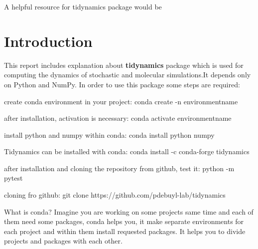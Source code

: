 \documentclass[12pt, a4paper, twoside]{report}
\begin{document}
%
%
A helpful resource for tidynamics package would be \cite{ tidynamics_2018}

%






\newpage
\section{Introduction}

This report includes explanation about \textbf{tidynamics} package which is used for computing the dynamics of stochastic and molecular simulations.It depends only on Python and NumPy. In order to use this package some steps are required:\newline

create conda environment in your project:\newline
conda create -n environmentname\newline

after installation, activation is necessary:\newline
conda activate environmentname\newline

install python and numpy within conda:\newline
conda install python numpy\newline

Tidynamics can be installed with conda:\newline
conda install -c conda-forge tidynamics\newline

after installation and cloning the repository from github, test it:\newline
python -m pytest\newline 

cloning fro github:\newline
git clone https://github.com/pdebuyl-lab/tidynamics\newline

What is conda? Imagine you are working on some projects same time and each of them need some packages, conda helps you, it make separate environments for each project and within them install requested packages. It helps you to divide projects and packages with each other.\newpage
\end{document}
